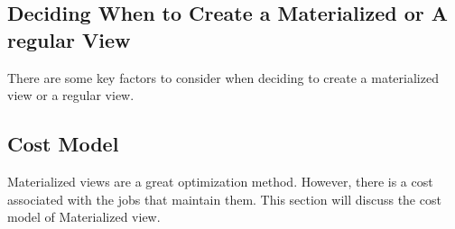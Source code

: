 \subsection{Deciding When to Create a Materialized or A regular View}There are some key factors to consider when deciding to create a materialized view or a regular view.




 \subsection{Cost Model}
Materialized views are a great optimization method. However, there is a cost associated with the jobs that maintain them. This section will discuss the cost model of Materialized view.\vspace{.4cm}

